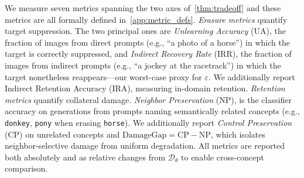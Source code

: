 We measure seven metrics spanning the two axes of~\cref{thm:tradeoff} and these metrics are all formally defined in~\cref{app:metric_defs}. 
\emph{Erasure metrics} quantify target suppression.
The two principal ones are \emph{Unlearning Accuracy} (UA), the fraction of images from direct prompts (e.g., ``a photo of a horse'') in which the target is correctly suppressed, and \emph{Indirect Recovery Rate} (IRR), the fraction of images from indirect prompts (e.g., ``a jockey at the racetrack'') in which the target nonetheless reappears---our worst-case proxy for $\varepsilon$. We additionally report Indirect Retention Accuracy (IRA), measuring in-domain retention.
\emph{Retention metrics} quantify collateral damage. 
\emph{Neighbor Preservation} (NP), is the classifier accuracy on generations from prompts naming semantically related concepts (e.g., \texttt{donkey}, \texttt{pony} when erasing \texttt{horse}). We additionally report \emph{Control Preservation} (CP) on unrelated concepts and $\mathrm{DamageGap} = \mathrm{CP} - \mathrm{NP}$, which isolates neighbor-selective damage from uniform degradation. All metrics are reported both absolutely and as relative changes from $\mathcal{D}_\theta$ to enable cross-concept comparison.





